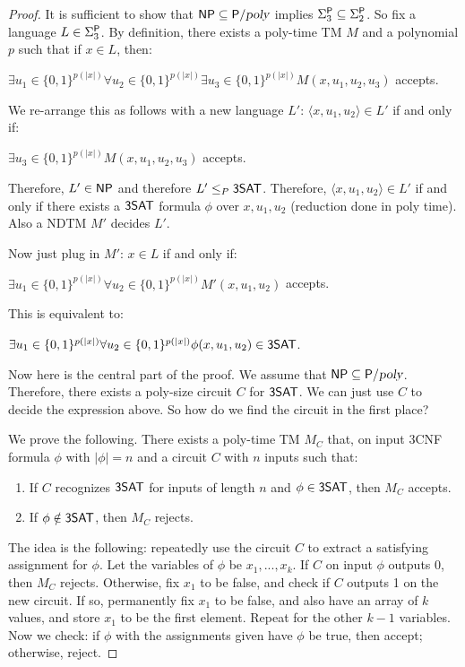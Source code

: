 \begin{proof}
It is sufficient to show that $\NP \subseteq \Ppoly$ implies $\Sigma_3^\P \subseteq \Sigma_2^\P$. So fix a language $L \in \Sigma_3^\P$. By definition, there exists a poly-time TM $M$ and a polynomial $p$ such that if $x \in L$, then:
\begin{center}
$\exists u_1 \in \{0, 1\}^{p(|x|)} \forall u_2 \in \{0, 1\}^{p(|x|)} \exists u_3 \in \{0, 1\}^{p(|x|)} M(x, u_1, u_2, u_3)$ accepts.
\end{center}
We re-arrange this as follows with a new language $L'$: $\langle x, u_1, u_2 \rangle \in L'$ if and only if:
\begin{center}
$\exists u_3 \in \{0, 1\}^{p(|x|)} M(x, u_1, u_2, u_3)$ accepts.
\end{center}
Therefore, $L' \in \NP$ and therefore $L' \le_P \ThreeSAT$. Therefore, $\langle x, u_1, u_2 \rangle \in L'$ if and only if there exists a $\ThreeSAT$ formula $\phi$ over $x, u_1, u_2$ (reduction done in poly time). Also a NDTM $M'$ decides $L'$.

\par Now just plug in $M'$: $x \in L$ if and only if:
\begin{center}
$\exists u_1 \in \{0, 1\}^{p(|x|)} \forall u_2 \in \{0, 1\}^{p(|x|)} M'(x, u_1, u_2)$ accepts.
\end{center}
This is equivalent to:
\begin{center}
$\exists u_1 \in \{0, 1\}^{p(|x|)} \forall u_2 \in \{0, 1\}^{p(|x|)} \phi(x, u_1, u_2) \in \ThreeSAT$.
\end{center}
Now here is the central part of the proof. We assume that $\NP \subseteq \Ppoly$. Therefore, there exists a poly-size circuit $C$ for $\ThreeSAT$. We can just use $C$ to decide the expression above. So how do we find the circuit in the first place?

\par We prove the following. There exists a poly-time TM $M_C$ that, on input 3CNF formula $\phi$ with $|\phi| = n$ and a circuit $C$ with $n$ inputs such that: 
\begin{enumerate}
\item If $C$ recognizes $\ThreeSAT$ for inputs of length $n$ and $\phi \in \ThreeSAT$, then $M_C$ accepts.
\item If $\phi \notin \ThreeSAT$, then $M_C$ rejects.
\end{enumerate}
The idea is the following: repeatedly use the circuit $C$ to extract a satisfying assignment for $\phi$. Let the variables of $\phi$ be $x_1, ..., x_k$. If $C$ on input $\phi$ outputs 0, then $M_C$ rejects. Otherwise, fix $x_1$ to be false, and check if $C$ outputs 1 on the new circuit. If so, permanently fix $x_1$ to be false, and also have an array of $k$ values, and store $x_1$ to be the first element. Repeat for the other $k-1$ variables. Now we check: if $\phi$ with the assignments given have $\phi$ be true, then accept; otherwise, reject.


\end{proof}

